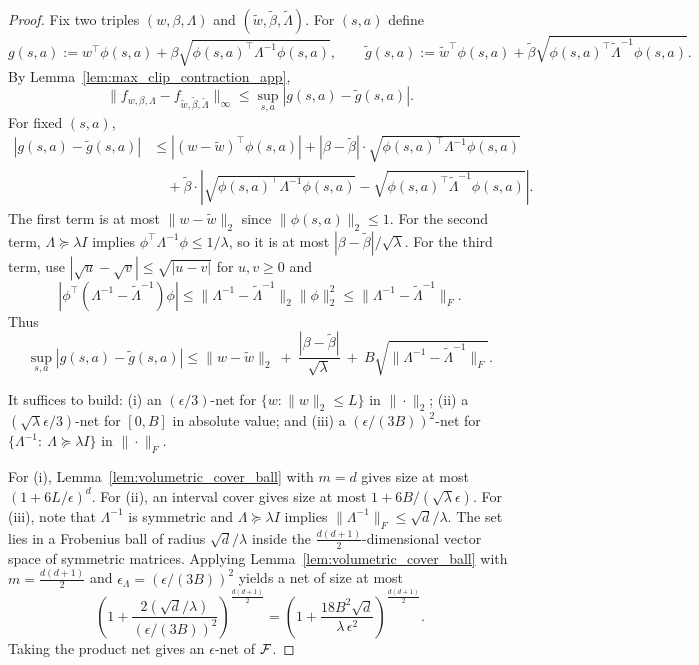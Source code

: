 \begin{proof}
Fix two triples $(w,\beta,\Lambda)$ and $(\tilde w,\tilde\beta,\tilde\Lambda)$.
For $(s,a)$ define
\[
g(s,a):=w^\top\phi(s,a)+\beta\sqrt{\phi(s,a)^\top\Lambda^{-1}\phi(s,a)},
\qquad
\tilde g(s,a):=\tilde w^\top\phi(s,a)+\tilde\beta\sqrt{\phi(s,a)^\top\tilde\Lambda^{-1}\phi(s,a)}.
\]
By Lemma~\ref{lem:max_clip_contraction_app},
\[
\|f_{w,\beta,\Lambda}-f_{\tilde w,\tilde\beta,\tilde\Lambda}\|_\infty
\le
\sup_{s,a}|g(s,a)-\tilde g(s,a)|.
\]
For fixed $(s,a)$,
\begin{align*}
|g(s,a)-\tilde g(s,a)|
&\le |(w-\tilde w)^\top\phi(s,a)|
+|\beta-\tilde\beta|\cdot \sqrt{\phi(s,a)^\top\Lambda^{-1}\phi(s,a)} \\
&\quad
+\tilde\beta\cdot\left|\sqrt{\phi(s,a)^\top\Lambda^{-1}\phi(s,a)}
-\sqrt{\phi(s,a)^\top\tilde\Lambda^{-1}\phi(s,a)}\right|.
\end{align*}
The first term is at most $\|w-\tilde w\|_2$ since $\|\phi(s,a)\|_2\le 1$.
For the second term, $\Lambda\succeq \lambda I$ implies
$\phi^\top\Lambda^{-1}\phi \le 1/\lambda$, so it is at most $|\beta-\tilde\beta|/\sqrt{\lambda}$.
For the third term, use $|\sqrt{u}-\sqrt{v}|\le \sqrt{|u-v|}$ for $u,v\ge 0$ and
\[
\left|\phi^\top(\Lambda^{-1}-\tilde\Lambda^{-1})\phi\right|
\le \|\Lambda^{-1}-\tilde\Lambda^{-1}\|_2\|\phi\|_2^2
\le \|\Lambda^{-1}-\tilde\Lambda^{-1}\|_F.
\]
Thus
\[
\sup_{s,a}|g(s,a)-\tilde g(s,a)|
\le
\|w-\tilde w\|_2\ +\ \frac{|\beta-\tilde\beta|}{\sqrt{\lambda}}
\ +\ B\sqrt{\|\Lambda^{-1}-\tilde\Lambda^{-1}\|_F}.
\]

It suffices to build:
(i) an $(\epsilon/3)$-net for $\{w:\|w\|_2\le L\}$ in $\|\cdot\|_2$;
(ii) a $(\sqrt{\lambda}\epsilon/3)$-net for $[0,B]$ in absolute value; and
(iii) a $(\epsilon/(3B))^2$-net for $\{\Lambda^{-1}:\ \Lambda\succeq \lambda I\}$ in $\|\cdot\|_F$.

For (i), Lemma~\ref{lem:volumetric_cover_ball} with $m=d$ gives size at most $(1+6L/\epsilon)^d$.
For (ii), an interval cover gives size at most $1+6B/(\sqrt{\lambda}\epsilon)$.
For (iii), note that $\Lambda^{-1}$ is symmetric and $\Lambda\succeq \lambda I$ implies
$\|\Lambda^{-1}\|_F\le \sqrt d/\lambda$. The set lies in a Frobenius ball of radius
$\sqrt d/\lambda$ inside the $\frac{d(d+1)}{2}$-dimensional vector space of symmetric matrices.
Applying Lemma~\ref{lem:volumetric_cover_ball} with
$m=\frac{d(d+1)}{2}$ and $\epsilon_\Lambda=(\epsilon/(3B))^2$ yields a net of size at most
\[
\left(1+\frac{2(\sqrt d/\lambda)}{(\epsilon/(3B))^2}\right)^{\frac{d(d+1)}{2}}
=
\left(1+\frac{18B^2\sqrt d}{\lambda\,\epsilon^2}\right)^{\frac{d(d+1)}{2}}.
\]
Taking the product net gives an $\epsilon$-net of $\mathcal{F}$.
\end{proof}

